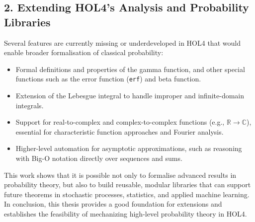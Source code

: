 \subsection*{2. Extending HOL4’s Analysis and Probability Libraries}

Several features are currently missing or underdeveloped in HOL4 that would enable broader formalisation of classical probability:
\begin{itemize}
  \item Formal definitions and properties of the gamma function, and other special functions such as the error function (\texttt{erf}) and beta function.
  \item Extension of the Lebesgue integral to handle improper and infinite-domain integrals.
  \item Support for real-to-complex and complex-to-complex functions (e.g., \( \mathbb{R} \to \mathbb{C} \)), essential for characteristic function approaches and Fourier analysis.
  \item Higher-level automation for asymptotic approximations, such as reasoning with Big-O notation directly over sequences and sums.
\end{itemize}

This work shows that it is possible not only to formalise advanced results in probability theory, but also to build reusable, modular libraries that can support future theorems in stochastic processes, statistics, and applied machine learning. In conclusion, this thesis provides a good foundation for extensions and establishes the feasibility of mechanizing high-level probability theory in HOL4.
